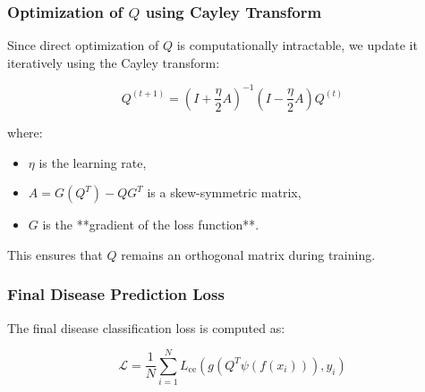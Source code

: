 \documentclass[a4paper,11pt]{article}
\begin{document}
\subsubsection{Optimization of \( Q \) using Cayley Transform}
Since direct optimization of \( Q \) is computationally intractable, we update it iteratively using the Cayley transform:

\begin{equation}
    Q^{(t+1)} = (I + \frac{\eta}{2} A)^{-1} (I - \frac{\eta}{2} A) Q^{(t)}
\end{equation}

where:
\begin{itemize}
    \item \( \eta \) is the learning rate,
    \item \( A = G(Q^T) - Q G^T \) is a skew-symmetric matrix,
    \item \( G \) is the **gradient of the loss function**.
\end{itemize}

This ensures that \( Q \) remains an orthogonal matrix during training.

\subsubsection{Final Disease Prediction Loss}
The final disease classification loss is computed as:

\begin{equation}
    \mathcal{L} = \frac{1}{N} \sum_{i=1}^{N} L_{\text{ce}}(g(Q^T \psi(f(x_i))), y_i)
\end{equation}
\end{document}

